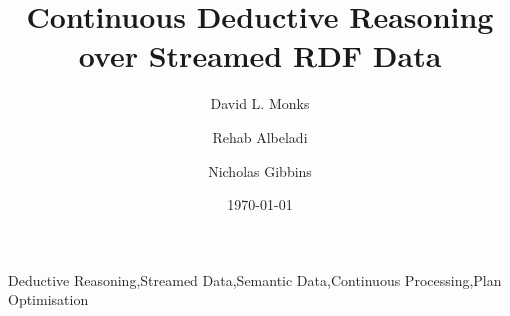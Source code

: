 \begin{frontmatter}
	\title{Continuous Deductive Reasoning over Streamed RDF Data}

	\author{David L. Monks}
	\author{Rehab Albeladi}
	\author{Nicholas Gibbins}
	\address{
	          Electronics and Computer Science,\\
	          University of Southampton,\\
	          Southampton, SO17 1BJ,\\
	          United Kingdom
	}

	\begin{abstract}
		
	\end{abstract}

	\begin{keyword}
	      Deductive Reasoning\sep Streamed Data\sep Semantic Data\sep Continuous Processing\sep Plan Optimisation
	\end{keyword}

	\date{\today}

\end{frontmatter}
